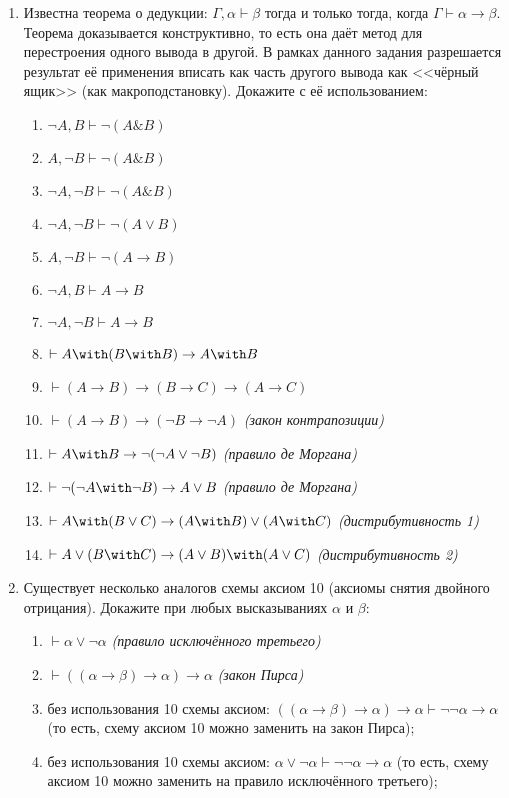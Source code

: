 \documentclass[10pt,a4paper,oneside]{article}
\begin{document}
\begin{enumerate}
\item Известна теорема о дедукции: $\Gamma, \alpha \vdash \beta$ тогда и только тогда, 
когда $\Gamma \vdash \alpha \rightarrow \beta$. Теорема доказывается конструктивно, то есть
она даёт метод для перестроения одного вывода в другой.
В рамках данного задания разрешается результат её применения вписать как часть другого вывода 
как <<чёрный ящик>> (как макроподстановку). Докажите с её использованием:
\begin{enumerate}
\item $\neg A, B \vdash \neg(A\& B)$
\item $A,\neg B \vdash \neg( A\& B)$
\item $\neg A,\neg B \vdash \neg( A\& B)$
\item $\neg A,\neg B \vdash \neg( A\vee B)$
\item $ A,\neg B \vdash \neg( A\rightarrow B)$
\item $\neg A, B \vdash  A\rightarrow B$
\item $\neg A,\neg B \vdash  A\rightarrow B$
\item $\vdash A \with (B \with B) \rightarrow A \with B$
\item $\vdash (A \rightarrow B) \rightarrow (B \rightarrow C) \rightarrow (A \rightarrow C)$
\item $\vdash (A \rightarrow B) \rightarrow (\neg B \rightarrow \neg A)$ \emph{(закон контрапозиции)}
\item $\vdash A \with B \rightarrow \neg (\neg A \vee \neg B)$ \emph{(правило де Моргана)}
\item $\vdash \neg (\neg A \with \neg B) \rightarrow A \vee B$ \emph{(правило де Моргана)}
\item $\vdash A \with (B \vee C) \rightarrow (A \with B) \vee (A \with C)$ \emph{(дистрибутивность 1)}
\item $\vdash A \vee (B \with C) \rightarrow (A \vee B) \with (A \vee C)$ \emph{(дистрибутивность 2)}
\end{enumerate}

\item Существует несколько аналогов схемы аксиом 10 (аксиомы снятия двойного отрицания). Докажите при любых
высказываниях $\alpha$ и $\beta$:
\begin{enumerate}
\item $\vdash \alpha \vee \neg \alpha$ \emph{(правило исключённого третьего)}
\item $\vdash ((\alpha \rightarrow \beta) \rightarrow \alpha)\rightarrow \alpha$ \emph{(закон Пирса)}
\item без использования 10 схемы аксиом: $((\alpha \rightarrow \beta) \rightarrow \alpha)\rightarrow \alpha \vdash \neg\neg \alpha\rightarrow \alpha$
(то есть, схему аксиом 10 можно заменить на закон Пирса);
\item без использования 10 схемы аксиом: $\alpha \vee \neg \alpha \vdash \neg\neg \alpha\rightarrow \alpha$
(то есть, схему аксиом 10 можно заменить на правило исключённого третьего);
\end{enumerate}


\end{enumerate}
\end{document}

